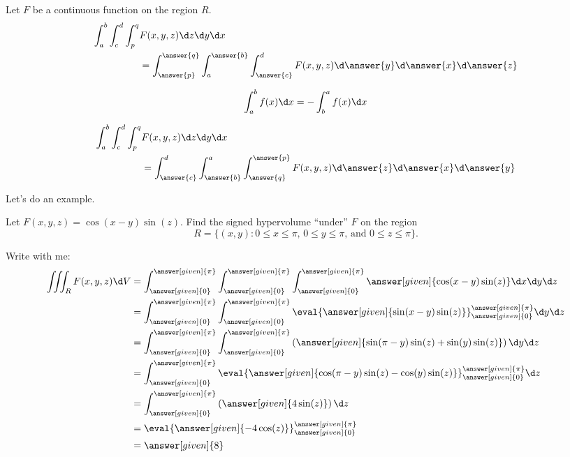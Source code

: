 \documentclass{ximera}
\begin{document}
\begin{question}
  Let $F$ be a continuous function on the region $R$.
  \begin{align*}
    \int_a^b\int_c^d\int_p^q &F(x,y,z)\d z \d y\d x \\
    &= \int_{\answer{p}}^{\answer{q}}\int_a^{\answer{b}}
    \int_{\answer{c}}^d F(x,y,z)\d \answer{y} \d \answer{x} \d \answer{z}
  \end{align*}
  \begin{question}
    \begin{hint}
      \[
      \int_a^b f(x) \d x = - \int_b^a f(x) \d x
      \]
    \end{hint}
    \begin{align*}
      \int_a^b\int_c^d\int_p^q &F(x,y,z)\d z \d y\d x \\
      &= \int_{\answer{c}}^{d}
    \int_{\answer{b}}^{a}\int_{\answer{q}}^{\answer{p}}
    F(x,y,z)\d \answer{z} \d \answer{x} \d \answer{y}
    \end{align*}
  \end{question}
\end{question}

Let's do an example.


\begin{example}
  Let $F(x,y,z) = \cos(x-y)\sin(z)$. Find the signed hypervolume ``under'' $F$ on the region
  \[
  R = \{(x,y):\text{$0\le x\le \pi$, $0\le y\le \pi$, and $0\le z\le \pi$}\}.
  \]
  \begin{explanation}
    Write with me:
    \begin{align*}
      \iiint_R F(x,y,z) \d V &=\int_{\answer[given]{0}}^{\answer[given]{\pi}}\int_{\answer[given]{0}}^{\answer[given]{\pi}}\int_{\answer[given]{0}}^{\answer[given]{\pi}} \answer[given]{\cos(x-y)\sin(z)} \d x \d y \d z \\
      &= \int_{\answer[given]{0}}^{\answer[given]{\pi}}\int_{\answer[given]{0}}^{\answer[given]{\pi}}\eval{\answer[given]{\sin(x-y)\sin(z)}}_{\answer[given]{0}}^{\answer[given]{\pi}}\d y \d z \\
      &= \int_{\answer[given]{0}}^{\answer[given]{\pi}}\int_{\answer[given]{0}}^{\answer[given]{\pi}}\left(\answer[given]{\sin(\pi-y)\sin(z) + \sin(y)\sin(z)}\right)\d y \d z \\
      &= \int_{\answer[given]{0}}^{\answer[given]{\pi}}\eval{\answer[given]{\cos(\pi-y)\sin(z) -\cos(y)\sin(z)}}_{\answer[given]{0}}^{\answer[given]{\pi}} \d z \\
      &= \int_{\answer[given]{0}}^{\answer[given]{\pi}}\left(\answer[given]{4\sin(z)}\right) \d z \\
      &= \eval{\answer[given]{-4\cos(z)}}_{\answer[given]{0}}^{\answer[given]{\pi}} \\
      &= \answer[given]{8}
    \end{align*}
  \end{explanation}
\end{example}
\end{document}
